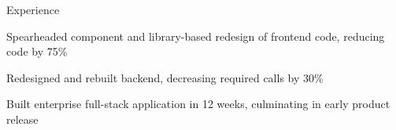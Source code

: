 \documentclass{resume} %
\begin{document}
\begin{rSection}{Experience}

\company{\microsoft}{\la}
\vspace{0.5em}


\company{\lefttravel}{\la}
\begin{rList}
\item Spearheaded component and library-based redesign of frontend code, 
    reducing code by 75\%
\item Redesigned and rebuilt backend, decreasing required calls by 30\%
\item Built enterprise full-stack application in 12 weeks, culminating in early
    product release
\end{rList}
\vspace{0.5em}


\company{\nymbl}{\la}

\end{rSection}

\end{document}
